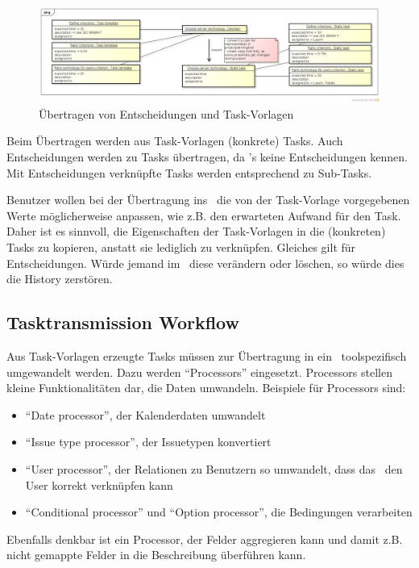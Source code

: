 				\begin{figure}[H]
					\includegraphics[width=\textwidth]{architecture/media/img/decisionTaskRelation.png}
					\centering
					\caption{Übertragen von Entscheidungen und Task-Vorlagen}
					\label{fig:DecisionTaskRelation}
				\end{figure}
				
				Beim Übertragen werden aus Task-Vorlagen (konkrete) Tasks.
				Auch Entscheidungen werden zu Tasks übertragen, da \ppt's keine Entscheidungen kennen.
				Mit Entscheidungen verknüpfte Tasks werden entsprechend zu Sub-Tasks.
				
				Benutzer wollen bei der Übertragung ins \ppt\ die von der Task-Vorlage vorgegebenen Werte möglicherweise anpassen, wie z.B. den erwarteten Aufwand für den Task.
				Daher ist es sinnvoll, die Eigenschaften der Task-Vorlagen in die (konkreten) Tasks zu kopieren, anstatt sie lediglich zu verknüpfen.
				Gleiches gilt für Entscheidungen. Würde jemand im \cdar\ diese verändern oder löschen,
				so würde dies die History zerstören.
			
		
		\subsection{Tasktransmission Workflow}
			Aus Task-Vorlagen erzeugte Tasks müssen zur Übertragung in ein \ppt\
			toolspezifisch umgewandelt werden. Dazu werden "`Processors"' eingesetzt.
			Processors stellen kleine Funktionalitäten dar, die Daten umwandeln.
			Beispiele für Processors sind:
			\begin{itemize}
				\item "`Date processor"', der Kalenderdaten umwandelt
				\item "`Issue type processor"', der Issuetypen konvertiert
				\item "`User processor"', der Relationen zu Benutzern so umwandelt, dass das \ppt\ den User korrekt verknüpfen kann
				\item "`Conditional processor"' und "`Option processor"', die Bedingungen verarbeiten
			\end{itemize}
			Ebenfalls denkbar ist ein Processor, der Felder aggregieren kann und damit z.B. nicht gemappte Felder in die Beschreibung überführen kann.
			
